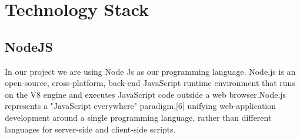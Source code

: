 \documentclass[12pt, a4paper]{article}
\begin{document}
\section{Technology Stack}


 
\subsection*{NodeJS}


In our project we are using Node Js as our programming language. Node.js is an open-source, cross-platform, back-end JavaScript runtime environment that runs on the V8 engine and executes JavaScript code outside a web browser.Node.js represents a "JavaScript everywhere" paradigm,[6] unifying web-application development around a single programming language, rather than different languages for server-side and client-side scripts.
\end{document}
